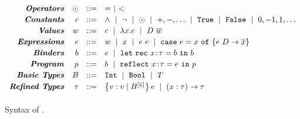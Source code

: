 \newcommand{\ra}[1]{\renewcommand{\arraystretch}{#1}}

\begin{figure}[t!]
\centering
\captionsetup{justification=centering}
\vspace{-5mm}
\centering
$$
\begin{array}{rrcl}
\emphbf{Operators}
  & \odot
  & ::= & = \spmid  <
\\[0.03in]

\emphbf{Constants}
  & c
  & ::=
  & \land \spmid \lnot \spmid \odot \spmid +,-,\dots  \spmid
      \etrue\spmid \efalse \spmid 0, -1, 1, \dots
\\[0.03in]

\emphbf{Values} 
  & w & ::=&  c
             \spmid \efun{x}{\typ}{e} \spmid D\ \overline{w}
\\[0.03in]

\emphbf{Expressions} 
  & e & ::=    & w \spmid x \spmid \eapp{e}{e}  
  \spmid \ecase{x}{e}{\dc}{\overline{x}}{e}
\\[0.03in]

\emphbf{Binders} 
  & \bd & ::= & e \spmid \eletb{x}{\gtyp}{\bd}{\bd}
\\[0.03in]

\emphbf{Program} 
  & \prog & ::= & \bd \spmid \erefb{x}{\gtyp}{e}{\prog}
\\[0.03in]


\emphbf{Basic Types} 
  & \btyp
  & ::=
  & \tint \spmid \tbool \spmid T
\\[0.03in]

\emphbf{Refined Types} 
  & \typ
  & ::=   & \tref{v}{\btyp^{[\tlabel]}}{\reft} \spmid \tfun{x}{\typ}{\typ}
\\[0.05in]
\end{array}
$$
\caption{{Syntax of \corelan.}}
\label{fig:syntax}
\vspace{-2mm}
\end{figure}

